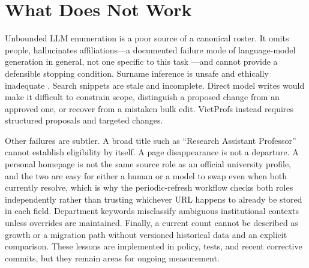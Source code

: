 \documentclass[11pt]{article}
\begin{document}
\section{What Does Not Work}
\label{sec:whatdoesnotwork}
Unbounded LLM enumeration is a poor source of a canonical roster.
It omits people, hallucinates affiliations---a documented failure mode of language-model generation in general, not one specific to this task \cite{ji2023survey}---and cannot provide a defensible stopping condition.
Surname inference is unsafe and ethically inadequate \cite{mateos2007name,ambekar2009name}.
Search snippets are stale and incomplete.
Direct model writes would make it difficult to constrain scope, distinguish a proposed change from an approved one, or recover from a mistaken bulk edit.
VietProfs instead requires structured proposals and targeted changes.

Other failures are subtler.
A broad title such as ``Research Assistant Professor'' cannot establish eligibility by itself.
A page disappearance is not a departure.
A personal homepage is not the same source role as an official university profile, and the two are easy for either a human or a model to swap even when both currently resolve, which is why the periodic-refresh workflow checks both roles independently rather than trusting whichever URL happens to already be stored in each field.
Department keywords misclassify ambiguous institutional contexts unless overrides are maintained.
Finally, a current count cannot be described as growth or a migration path without versioned historical data and an explicit comparison.
These lessons are implemented in policy, tests, and recent corrective commits, but they remain areas for ongoing measurement.
\end{document}
